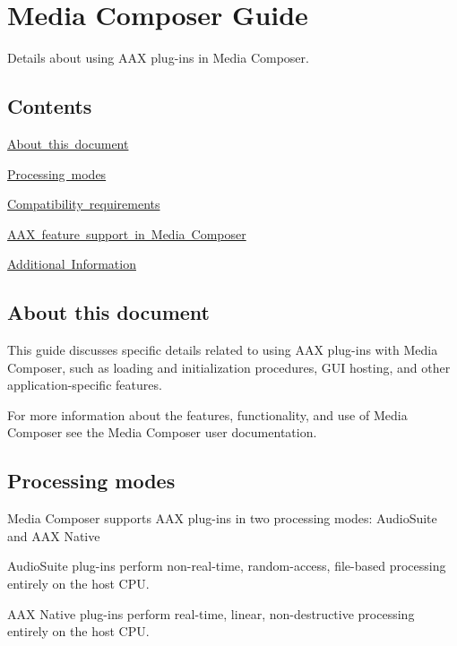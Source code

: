 \hypertarget{a00831}{}\section{Media Composer Guide}
\label{a00831}
Details about using A\+AX plug-\/ins in Media Composer. 

\hypertarget{a00831_aax_media_composer_guide_contents}{}\subsection{Contents}\label{a00831_aax_media_composer_guide_contents}
\begin{DoxyItemize}
\item \mbox{\hyperlink{a00831_aax_media_composer_guide__about_this_document}{About this document}} \item \mbox{\hyperlink{a00831_aax_media_composer_guide__processing_modes}{Processing modes}} \item \mbox{\hyperlink{a00831_aax_media_composer_guide__requirements}{Compatibility requirements}} \item \mbox{\hyperlink{a00831_aax_media_composer_guide__features}{A\+AX feature support in Media Composer}} \item \mbox{\hyperlink{a00831_aax_media_composer_guide__additional_information}{Additional Information}}\end{DoxyItemize}
 \hypertarget{a00831_aax_media_composer_guide__about_this_document}{}\subsection{About this document}\label{a00831_aax_media_composer_guide__about_this_document}
This guide discusses specific details related to using A\+AX plug-\/ins with Media Composer, such as loading and initialization procedures, G\+UI hosting, and other application-\/specific features.

For more information about the features, functionality, and use of Media Composer see the Media Composer user documentation. 

 \hypertarget{a00831_aax_media_composer_guide__processing_modes}{}\subsection{Processing modes}\label{a00831_aax_media_composer_guide__processing_modes}
Media Composer supports A\+AX plug-\/ins in two processing modes\+: Audio\+Suite and A\+AX Native 
\begin{DoxyItemize}
\item Audio\+Suite plug-\/ins perform non-\/real-\/time, random-\/access, file-\/based processing entirely on the host C\+PU.  
\item A\+AX Native plug-\/ins perform real-\/time, linear, non-\/destructive processing entirely on the host C\+PU. 
\end{DoxyItemize}

